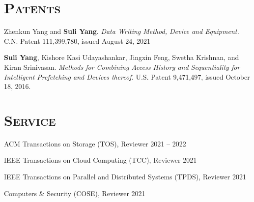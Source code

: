 \documentclass[10pt, letterpaper]{article}
\renewenvironment{itemize}{
  \begin{list}{}{
    \setlength{\leftmargin}{1.2em}
    \setlength{\itemsep}{0.12em}
    \setlength{\parskip}{0pt}
    \setlength{\parsep}{0.12em}
  }
}{
  \end{list}
}
\begin{document}
\section*{\textsc{Patents}}
\begin{enumerate}[fullwidth,itemindent=1.1em,label={[\arabic*]}]
    \item Zhenkun Yang and {\bf Suli Yang}. \textit{Data Writing Method, Device and Equipment.} C.N. Patent 111,399,780, issued August 24, 2021

     \item {\bf Suli Yang}, Kishore Kasi Udayashankar, Jingxin Feng, Swetha Krishnan, and Kiran Srinivasan. \textit{Methods for Combining Access History and Sequentiality for Intelligent Prefetching and Devices thereof.} U.S. Patent 9,471,497, issued October 18, 2016.

\end{enumerate}


\section*{\textsc{Service}}
\begin{itemize}
	\item ACM Transactions on Storage (TOS), Reviewer \hfill 2021 -- 2022
	\item IEEE Transactions on Cloud Computing (TCC), Reviewer \hfill 2021
        \item IEEE Transactions on Parallel and Distributed Systems (TPDS), Reviewer \hfill 2021
	\item Computers \& Security (COSE), Reviewer \hfill 2021
\end{itemize}
\end{document}
